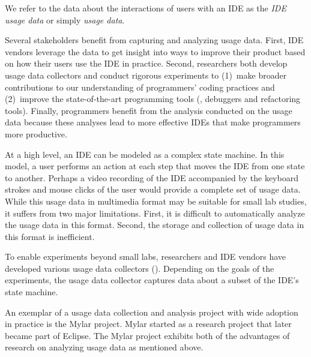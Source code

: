 We refer to the data about the interactions of users with an IDE as the
\emph{IDE usage data} or simply \emph{usage data}.

%
Several stakeholders benefit from capturing and analyzing usage data. First, IDE
vendors leverage the data to get insight into ways to improve their product
based on how their users use the IDE in practice. Second, researchers both
develop usage data collectors and conduct rigorous experiments to (1)~make
broader contributions to our understanding of programmers' coding practices and
(2)~improve the state-of-the-art programming tools (\eg, debuggers and
refactoring tools). Finally, programmers benefit from the analysis conducted on
the usage data because these analyses lead to more effective IDEs that make
programmers more productive.

At a high level, an IDE can be modeled as a complex state machine. In this
model, a user performs an action at each step that moves the IDE from one state
to another.
%
Perhaps a video recording of the IDE accompanied by the keyboard strokes and
mouse clicks of the user would provide a complete set of usage data.
%
While this usage data in multimedia format may be suitable for small lab
studies, it suffers from two major limitations. First, it is difficult to
automatically analyze the usage data in this format. Second, the storage and
collection of usage data in this format is inefficient.

To enable experiments beyond small labs, researchers and IDE vendors have
developed various usage data collectors ().
Depending on the goals of the experiments, the usage data collector captures
data about a subset of the IDE's state machine.

An exemplar of a usage data collection and analysis project with wide adoption
in practice is the Mylar project. Mylar started as a research project that later
became part of Eclipse. The Mylar project exhibits both of the advantages of
research on analyzing usage data as mentioned above.

